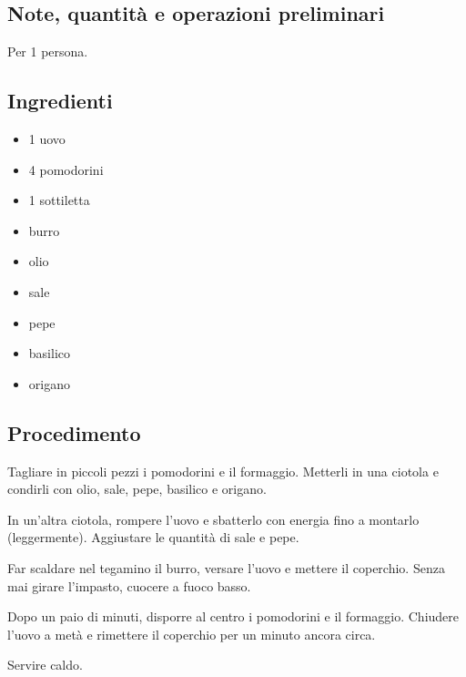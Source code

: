 \documentclass[12pt]{article}
\begin{document}
\subsection*{Note, quantità e operazioni preliminari}
Per 1 persona.

\bigskip
\bigskip

\begin{multicols}{2}
\subsection*{Ingredienti}
\begin{itemize}
	\item 1 uovo
	\item 4 pomodorini
	\item 1 sottiletta
	\item burro
	\item olio
	\item sale
	\item pepe
	\item basilico
	\item origano
\end{itemize}

\vspace*{\fill}

\columnbreak
\subsection*{Procedimento}

Tagliare in piccoli pezzi i pomodorini e il formaggio.
Metterli in una ciotola e condirli con olio, sale, pepe, basilico e origano.
\medskip

In un'altra ciotola, rompere l'uovo e sbatterlo con energia fino a montarlo (leggermente).
Aggiustare le quantità di sale e pepe.
\medskip

Far scaldare nel tegamino il burro, versare l'uovo e mettere il coperchio.
Senza mai girare l'impasto, cuocere a fuoco basso.
\medskip

Dopo un paio di minuti, disporre al centro i pomodorini e il formaggio.
Chiudere l'uovo a metà e rimettere il coperchio per un minuto ancora circa.
\medskip

Servire caldo.

\end{multicols}

\newpage

\end{document}
